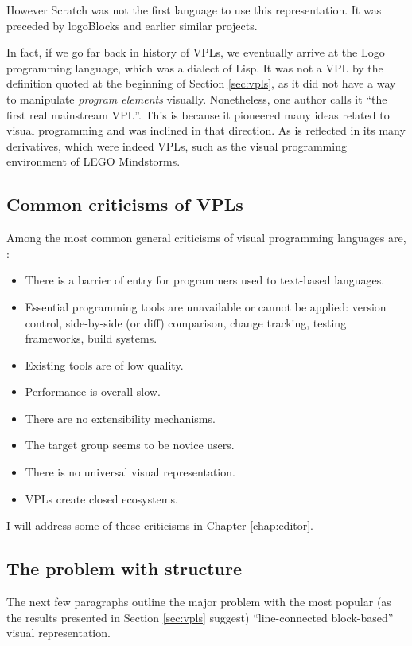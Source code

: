 However Scratch was not the first language to use this representation. It was preceded by logoBlocks and earlier similar projects\cite{vpl_history}.

In fact, if we go far back in history of VPLs, we eventually arrive at the Logo programming language, which was a dialect of Lisp\cite{logo_history, logo_wikipedia}. It was not a VPL by the definition quoted at the beginning of Section \ref{sec:vpls}, as it did not have a way to manipulate \textit{program elements} visually. Nonetheless, one author calls it ``the first real mainstream VPL''\cite{vpl_infograph}. This is because it pioneered many ideas related to visual programming and was inclined in that direction. As is reflected in its many derivatives, which were indeed VPLs\cite{cricket_logo}, such as the visual programming environment of LEGO Mindstorms\cite{mindstorms_history, mindstorms_wikipedia, mindstorms_site}.

\subsection{Common criticisms of VPLs}\label{sub:vpl_crit}
Among the most common general criticisms of visual programming languages are\cite{vp_vs_tp, vp_unbelievable, vp_advantages_disadvantages}, \cite[Section~Criticism]{labview_wikipedia}:
\begin{itemize}
\item There is a barrier of entry for programmers used to text-based languages.
\item Essential programming tools are unavailable or cannot be applied: version control, side-by-side (or diff) comparison, change tracking, testing frameworks, build systems.
\item Existing tools are of low quality.
\item Performance is overall slow.
\item There are no extensibility mechanisms.
\item The target group seems to be novice users.
\item There is no universal visual representation.
\item VPLs create closed ecosystems.
\end{itemize}

I will address some of these criticisms in Chapter \ref{chap:editor}.

\subsection{The problem with structure}
The next few paragraphs outline the major problem with the most popular (as the results presented in Section \ref{sec:vpls} suggest) ``line-connected block-based'' visual representation.

